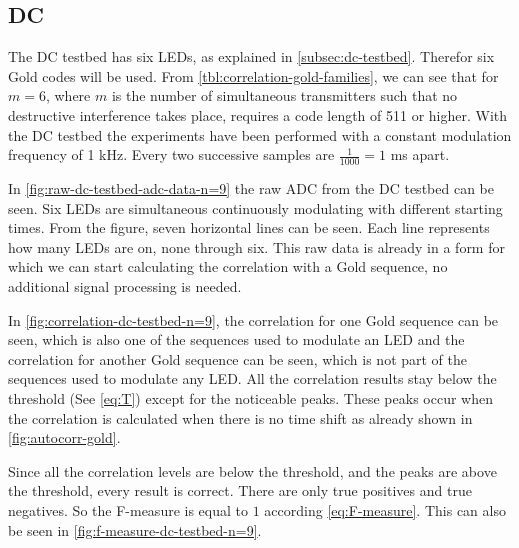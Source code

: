 
\subsection{DC}
\label{subsec:dc-testbed-eval}

The DC testbed has six LEDs, as explained in \autoref{subsec:dc-testbed}.
Therefor six Gold codes will be used.
From \autoref{tbl:correlation-gold-families}, we can see that for $m = 6$, where $m$ is the number of simultaneous transmitters such that no destructive interference takes place, requires a code length of 511 or higher.
With the DC testbed the experiments have been performed with a constant modulation frequency of 1 kHz.
Every two successive samples are $\frac{1}{1000} = 1$ ms apart.

In \autoref{fig:raw-dc-testbed-adc-data-n=9} the raw ADC from the DC testbed can be seen.
Six LEDs are simultaneous continuously modulating with different starting times.
From the figure, seven horizontal lines can be seen.
Each line represents how many LEDs are on, none through six.
This raw data is already in a form for which we can start calculating the correlation with a Gold sequence, no additional signal processing is needed.

In \autoref{fig:correlation-dc-testbed-n=9}, the correlation for one Gold sequence can be seen, which is also one of the sequences used to modulate an LED and the correlation for another Gold sequence can be seen, which is not part of the sequences used to modulate any LED.
All the correlation results stay below the threshold (See \autoref{eq:T}) except for the noticeable peaks.
These peaks occur when the correlation is calculated when there is no time shift as already shown in \autoref{fig:autocorr-gold}.

Since all the correlation levels are below the threshold, and the peaks are above the threshold, every result is correct.
There are only true positives and true negatives.
So the F-measure is equal to $1$ according \autoref{eq:F-measure}.
This can also be seen in \autoref{fig:f-measure-dc-testbed-n=9}.

